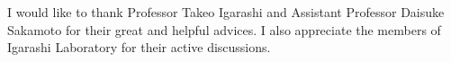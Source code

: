 I would like to thank Professor Takeo Igarashi and Assistant Professor Daisuke Sakamoto for their great and helpful advices. I also appreciate the members of Igarashi Laboratory for their active discussions.
